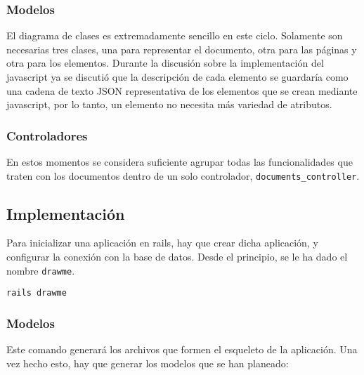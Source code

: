 \subsubsection{Modelos} %
\label{ssub:modelos}

El diagrama de clases es extremadamente sencillo en este ciclo. Solamente son necesarias tres clases, una para representar el documento, otra para las páginas y otra para los elementos. Durante la discusión sobre la implementación del javascript ya se discutió que la descripción de cada elemento se guardaría como una cadena de texto JSON representativa de los elementos que se crean mediante javascript, por lo tanto, un elemento no necesita más variedad de atributos.




\subsubsection{Controladores} %
\label{ssub:controladores}

En estos momentos se considera suficiente agrupar todas las funcionalidades que traten con los documentos dentro de un solo controlador, \texttt{documents\_controller}. 



\subsection{Implementación} %
\label{sub:implementacion}

Para inicializar una aplicación en rails, hay que crear dicha aplicación, y configurar la conexión con la base de datos. Desde el principio, se le ha dado el nombre \texttt{drawme}. 

\begin{verbatim}
rails drawme
\end{verbatim}

\subsubsection{Modelos} %
\label{ssub:modelos}

Este comando generará los archivos que formen el esqueleto de la aplicación. Una vez hecho esto, hay que generar los modelos que se han planeado:

